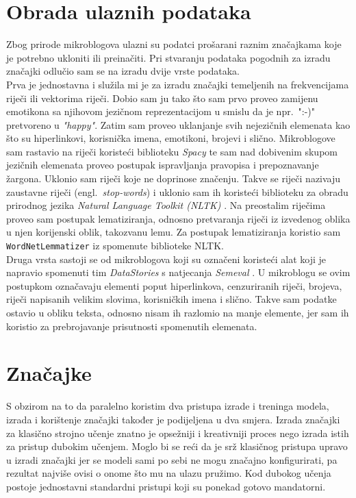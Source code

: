 \documentclass[times, utf8, zavrsni]{fer}
\begin{document}
\section{Obrada ulaznih podataka}

Zbog prirode mikroblogova ulazni su podatci prošarani raznim značajkama koje je potrebno ukloniti ili preinačiti. Pri stvaranju podataka pogodnih za izradu značajki odlučio sam se na izradu dvije vrste podataka.\\
\noindent Prva je jednostavna i služila mi je za izradu značajki temeljenih na frekvencijama riječi ili vektorima riječi. Dobio sam ju tako što sam prvo proveo zamijenu emotikona sa njihovom jezičnom reprezentacijom u smislu da je npr.~":-)" pretvoreno u \emph{"happy"}. Zatim sam proveo uklanjanje svih nejezičnih elemenata kao što su hiperlinkovi, korisnička imena, emotikoni, brojevi i slično. Mikroblogove sam rastavio na riječi koristeći biblioteku \emph{Spacy} te sam nad dobivenim skupom jezičnih elemenata proveo postupak ispravljanja pravopisa i prepoznavanje žargona. Uklonio sam riječi koje ne doprinose značenju. Takve se riječi nazivaju zaustavne riječi (engl.~\emph{stop-words}) i uklonio sam ih koristeći biblioteku za obradu prirodnog jezika \emph{Natural Language Toolkit (NLTK)} \citep{nltk}. Na preostalim riječima proveo sam postupak lematiziranja, odnosno pretvaranja riječi iz izvedenog oblika u njen korijenski oblik, takozvanu lemu. Za postupak lematiziranja koristio sam \texttt{WordNetLemmatizer} iz spomenute biblioteke \gls{NLTK}.\\
\noindent Druga vrsta sastoji se od mikroblogova koji su označeni koristeći alat koji je napravio spomenuti tim \emph{DataStories} s natjecanja \emph{Semeval} \citep{datastories-Semeval}. U mikroblogu se ovim postupkom označavaju elementi poput hiperlinkova, cenzuriranih riječi, brojeva, riječi napisanih velikim slovima, korisničkih imena i slično. Takve sam podatke ostavio u obliku teksta, odnosno nisam ih razlomio na manje elemente, jer sam ih koristio za prebrojavanje prisutnosti spomenutih elemenata.

\section{Značajke}

S obzirom na to da paralelno koristim dva pristupa izrade i treninga modela, izrada i korištenje značajki također je podijeljena u dva smjera. Izrada značajki za klasično strojno učenje znatno je opsežniji i kreativniji proces nego izrada istih za pristup dubokim učenjem. Moglo bi se reći da je srž klasičnog pristupa upravo u izradi značajki jer se modeli sami po sebi ne mogu značajno konfigurirati, pa rezultat najviše ovisi o onome što mu na ulazu pružimo. Kod dubokog učenja postoje jednostavni standardni pristupi koji su ponekad gotovo mandatorni. 
\end{document}
